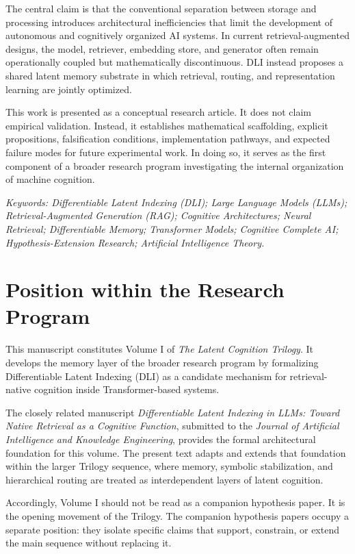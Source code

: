 The central claim is that the conventional separation between storage and processing introduces architectural inefficiencies that limit the development of autonomous and cognitively organized AI systems. In current retrieval-augmented designs, the model, retriever, embedding store, and generator often remain operationally coupled but mathematically discontinuous. DLI instead proposes a shared latent memory substrate in which retrieval, routing, and representation learning are jointly optimized.

This work is presented as a conceptual research article. It does not claim empirical validation. Instead, it establishes mathematical scaffolding, explicit propositions, falsification conditions, implementation pathways, and expected failure modes for future experimental work. In doing so, it serves as the first component of a broader research program investigating the internal organization of machine cognition.

\noindent \textit{Keywords: Differentiable Latent Indexing (DLI); Large Language Models (LLMs); Retrieval-Augmented Generation (RAG); Cognitive Architectures; Neural Retrieval; Differentiable Memory; Transformer Models; Cognitive Complete AI; Hypothesis-Extension Research; Artificial Intelligence Theory.}

\section*{Position within the Research Program}

This manuscript constitutes Volume I of \textit{The Latent Cognition Trilogy}. It develops the memory layer of the broader research program by formalizing Differentiable Latent Indexing (DLI) as a candidate mechanism for retrieval-native cognition inside Transformer-based systems.

The closely related manuscript \textit{Differentiable Latent Indexing in LLMs: Toward Native Retrieval as a Cognitive Function}, submitted to the \textit{Journal of Artificial Intelligence and Knowledge Engineering}, provides the formal architectural foundation for this volume. The present text adapts and extends that foundation within the larger Trilogy sequence, where memory, symbolic stabilization, and hierarchical routing are treated as interdependent layers of latent cognition.

Accordingly, Volume I should not be read as a companion hypothesis paper. It is the opening movement of the Trilogy. The companion hypothesis papers occupy a separate position: they isolate specific claims that support, constrain, or extend the main sequence without replacing it.


